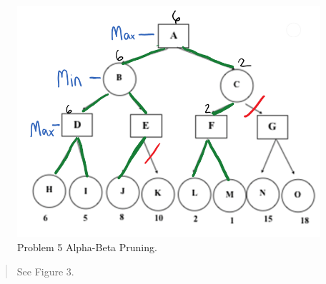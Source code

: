 \documentclass[11pt]{article}
\newenvironment{problem}[2][Problem]{\begin{trivlist}
\item[\hskip \labelsep {\bfseries #1}\hskip \labelsep {\bfseries #2.}]}{\end{trivlist}}
\begin{document}
\begin{problem}{5}
	\begin{figure}
		\includegraphics[scale=1]{cse545_hw2_p5.PNG}
		\caption{Problem 5 Alpha-Beta Pruning.}
		\label{fig.bfs}
	\end{figure}
	\begin{verse}
		See Figure 3.
	\end{verse}
\end{problem}
\end{document}
